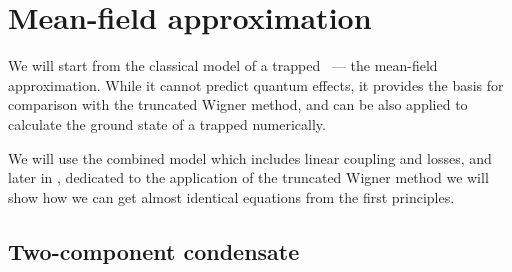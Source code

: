 \section{Mean-field approximation}
\label{sec:bec-noise:mean-field}

We will start from the classical model of a trapped ~--- the mean-field approximation.
While it cannot predict quantum effects, it provides the basis for comparison with the truncated Wigner method, and can be also applied to calculate the ground state of a trapped  numerically.

We will use the combined model which includes linear coupling and losses, and later in , dedicated to the application of the truncated Wigner method we will show how we can get almost identical equations from the first principles.


\subsection{Two-component condensate}

